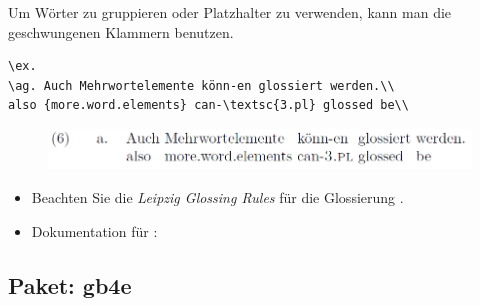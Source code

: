 \begin{frame}[fragile]


Um Wörter zu gruppieren oder Platzhalter zu verwenden, kann man die geschwungenen Klammern benutzen.

\begin{lstlisting}
\ex.
\ag. Auch Mehrwortelemente könn-en glossiert werden.\\
also {more.word.elements} can-\textsc{3.pl} glossed be\\
\end{lstlisting}


\begin{figure}
	\centering
	\includegraphics[scale=.4]{../../texfiles-beamer/tex-material/WissArb-latex/linguex5}
\end{figure}

%

\begin{itemize}
	\item Beachten Sie die \emph{Leipzig Glossing Rules} für die Glossierung \citep[vgl.][]{LeipzigGloss15a}.

	\item Dokumentation für : \citet{Sternefeld13a}
\end{itemize}

\end{frame}


\subsection{Paket: gb4e}


